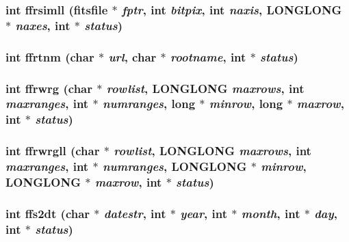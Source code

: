 \subsubsection{\setlength{\rightskip}{0pt plus 5cm}int ffrsimll (\bf{fitsfile} $\ast$ {\em fptr}, int {\em bitpix}, int {\em naxis}, \bf{LONGLONG} $\ast$ {\em naxes}, int $\ast$ {\em status})}\label{fitsio_8h_de7508b8896dfcdd7e4d35164688ef92}


\subsubsection{\setlength{\rightskip}{0pt plus 5cm}int ffrtnm (char $\ast$ {\em url}, char $\ast$ {\em rootname}, int $\ast$ {\em status})}\label{fitsio_8h_3caef8f2e1fa0c29ba79cfd854862f7e}


\subsubsection{\setlength{\rightskip}{0pt plus 5cm}int ffrwrg (char $\ast$ {\em rowlist}, \bf{LONGLONG} {\em maxrows}, int {\em maxranges}, int $\ast$ {\em numranges}, long $\ast$ {\em minrow}, long $\ast$ {\em maxrow}, int $\ast$ {\em status})}\label{fitsio_8h_2a49a73ce7919bc7fd5f1c3ed5bf0090}


\subsubsection{\setlength{\rightskip}{0pt plus 5cm}int ffrwrgll (char $\ast$ {\em rowlist}, \bf{LONGLONG} {\em maxrows}, int {\em maxranges}, int $\ast$ {\em numranges}, \bf{LONGLONG} $\ast$ {\em minrow}, \bf{LONGLONG} $\ast$ {\em maxrow}, int $\ast$ {\em status})}\label{fitsio_8h_e997ee959852fc3d52dd2bbd9ba45819}


\subsubsection{\setlength{\rightskip}{0pt plus 5cm}int ffs2dt (char $\ast$ {\em datestr}, int $\ast$ {\em year}, int $\ast$ {\em month}, int $\ast$ {\em day}, int $\ast$ {\em status})}\label{fitsio_8h_088b875388fc72d3d8ad8134a025f00c}


